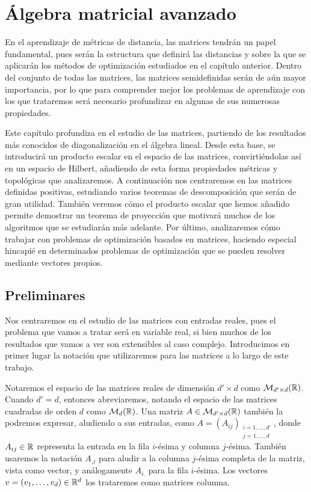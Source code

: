 \chapter{Álgebra matricial avanzado} \label{chapter:matrices}

En el aprendizaje de métricas de distancia, las matrices tendrán un papel fundamental, pues serán la estructura que definirá las distancias y sobre la que se aplicarán los métodos de optimización estudiados en el capítulo anterior. Dentro del conjunto de todas las matrices, las matrices semidefinidas serán de aún mayor importancia, por lo que para comprender mejor los problemas de aprendizaje con los que trataremos será necesario profundizar en algunas de sus numerosas propiedades.

Este capítulo profundiza en el estudio de las matrices, partiendo de los resultados más conocidos de diagonalización en el álgebra lineal. Desde esta base, se introducirá un producto escalar en el espacio de las matrices, convirtiéndolas así en un espacio de Hilbert, añadiendo de esta forma propiedades métricas y topológicas que analizaremos. A continuación nos centraremos en las matrices definidas positivas, estudiando varios teoremas de descomposición que serán de gran utilidad. También veremos cómo el producto escalar que hemos añadido permite demostrar un teorema de proyección que motivará muchos de los algoritmos que se estudiarán más adelante. Por último, analizaremos cómo trabajar con problemas de optimización basados en matrices, haciendo especial hincapié en determinados problemas de optimización que se pueden resolver mediante vectores propios.

\section{Preliminares}

Nos centraremos en el estudio de las matrices con entradas reales, pues el problema que vamos a tratar será en variable real, si bien muchos de los resultados que vamos a ver son extensibles al caso complejo. Introducimos en primer lugar la notación que utilizaremos para las matrices a lo largo de este trabajo.

Notaremos el espacio de las matrices reales de dimensión $d' \times d$ como $\mathcal{M}_{d'\times d}(\mathbb{R})$. Cuando $d' = d$, entonces abreviaremos, notando el espacio de las matrices cuadradas de orden $d$ como $\mathcal{M}_d(\mathbb{R})$. Una matriz $A \in \mathcal{M}_{d'\times d}(\mathbb{R})$ también la podremos expresar, aludiendo a sus entradas, como $A = (A_{ij})_{\substack{i=1,\dots,d' \\ j=1,\dots,d}}$, donde $A_{ij} \in \mathbb{R}$ representa la entrada en la fila $i$-ésima y columna $j$-ésima. También usaremos la notación $A_{.j}$ para aludir a la columna $j$-ésima completa de la matriz, vista como vector, y análogamente $A_{i.}$ para la fila $i$-ésima. Los vectores $v = (v_1,\dots,v_d) \in \mathbb{R}^d$ los trataremos como matrices columna.

